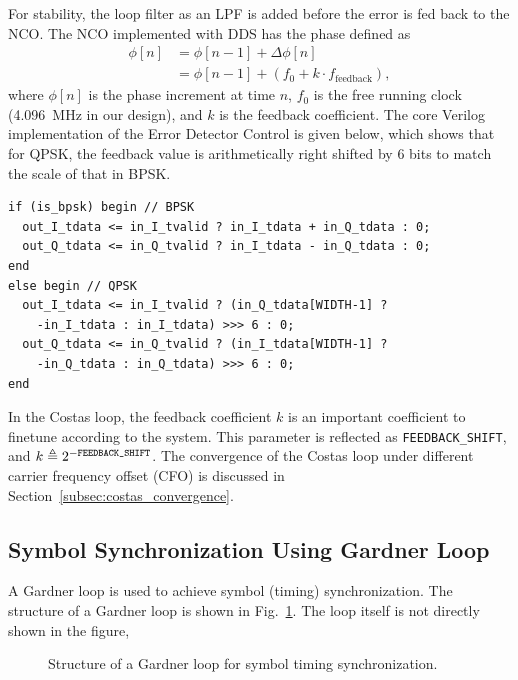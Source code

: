 \documentclass[journal,twoside]{IEEEtran}
\begin{document}
      For stability, the loop filter as an LPF is added before the error is fed back to the NCO.     
      The NCO implemented with DDS has the phase defined as
      \begin{equation}
        \begin{aligned}
          \phi[n]&=\phi[n-1]+\Delta\phi[n]\\
          &=\phi[n-1]+(f_0+k\cdot f_{\text{feedback}}),
        \end{aligned}
      \end{equation}
      where $\phi[n]$ is the phase increment at time $n$,
      $f_0$ is the free running clock (\qty{4.096}{MHz} in our design),
      and $k$ is the feedback coefficient.
      The core Verilog implementation of the Error Detector Control is given below,
      which shows that for QPSK, the feedback value is arithmetically right shifted by 6 bits
      to match the scale of that in BPSK.
      \begin{verbatim}
if (is_bpsk) begin // BPSK
  out_I_tdata <= in_I_tvalid ? in_I_tdata + in_Q_tdata : 0;
  out_Q_tdata <= in_Q_tvalid ? in_I_tdata - in_Q_tdata : 0;
end
else begin // QPSK
  out_I_tdata <= in_I_tvalid ? (in_Q_tdata[WIDTH-1] ?
    -in_I_tdata : in_I_tdata) >>> 6 : 0;
  out_Q_tdata <= in_Q_tvalid ? (in_I_tdata[WIDTH-1] ?
    -in_Q_tdata : in_Q_tdata) >>> 6 : 0;
end
      \end{verbatim}
      
      In the Costas loop,
      the feedback coefficient $k$ is an important coefficient to finetune according to the system.
      This parameter is reflected as \texttt{FEEDBACK\_SHIFT}, and $k\triangleq2^{-\text{\texttt{FEEDBACK\_SHIFT}}}$.
      The convergence of the Costas loop under different carrier frequency offset (CFO) is discussed in Section~\ref{subsec:costas_convergence}.

    \subsection{Symbol Synchronization Using Gardner Loop}

      A Gardner loop \cite{gardner1986bpsk} is used to achieve symbol (timing) synchronization.
      The structure of a Gardner loop is shown in Fig.~\ref{fig:gardner_loop}.
      The loop itself is not directly shown in the figure,
      \begin{figure}[htbp]
        
        \caption{Structure of a Gardner loop for symbol timing synchronization.}
        \label{fig:gardner_loop}
      \end{figure}
\end{document}
